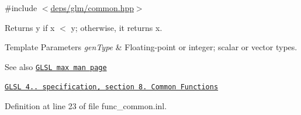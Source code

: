 {\ttfamily \#include $<$\hyperlink{common_8hpp}{deps/glm/common.\+hpp}$>$}

Returns y if x $<$ y; otherwise, it returns x.


\begin{DoxyTemplParams}{Template Parameters}
{\em gen\+Type} & Floating-\/point or integer; scalar or vector types.\\
\hline
\end{DoxyTemplParams}
\begin{DoxySeeAlso}{See also}
\href{http://www.opengl.org/sdk/docs/manglsl/xhtml/max.xml}{\tt G\+L\+SL max man page} 

\href{http://www.opengl.org/registry/doc/GLSLangSpec.4.20.8.pdf}{\tt G\+L\+SL 4.. specification, section 8. Common Functions} 
\end{DoxySeeAlso}


Definition at line 23 of file func\+\_\+common.\+inl.



